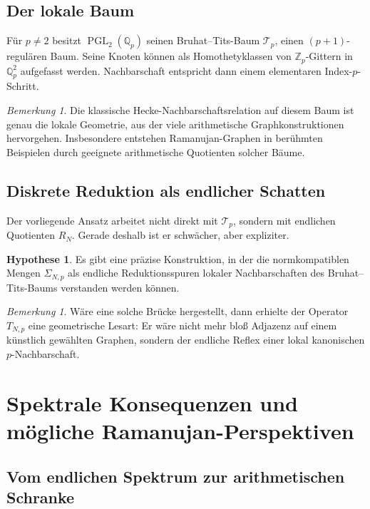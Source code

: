 \documentclass[12pt,a4paper]{article}
\newcommand{\PGL}{\operatorname{PGL}}
\theoremstyle{plain}
\theoremstyle{definition}
\newtheorem{hypothese}[satz]{Hypothese}
\theoremstyle{remark}
\newtheorem{bemerkung}[satz]{Bemerkung}
\newcommand{\Q}{\mathbb{Q}}
\newcommand{\Z}{\mathbb{Z}}
\begin{document}
	\subsection{Der lokale Baum}
	
	Für \(p\neq 2\) besitzt \(\PGL_2(\Q_p)\) seinen Bruhat--Tits-Baum \(\mathcal{T}_p\),
	einen \((p+1)\)-regulären Baum.
	Seine Knoten können als Homothetyklassen von \(\Z_p\)-Gittern in \(\Q_p^2\)
	aufgefasst werden.
	Nachbarschaft entspricht dann einem elementaren Index-\(p\)-Schritt.
	
	\begin{bemerkung}
		Die klassische Hecke-Nachbarschaftsrelation auf diesem Baum ist genau die
		lokale Geometrie, aus der viele arithmetische Graphkonstruktionen hervorgehen.
		Insbesondere entstehen Ramanujan-Graphen in berühmten Beispielen
		durch geeignete arithmetische Quotienten solcher Bäume.
	\end{bemerkung}
	
	\subsection{Diskrete Reduktion als endlicher Schatten}
	
	Der vorliegende Ansatz arbeitet nicht direkt mit \(\mathcal{T}_p\),
	sondern mit endlichen Quotienten \(R_N\).
	Gerade deshalb ist er schwächer, aber expliziter.
	
	\begin{hypothese}
		Es gibt eine präzise Konstruktion, in der die normkompatiblen Mengen
		\(\Sigma_{N,p}\) als endliche Reduktionsspuren lokaler Nachbarschaften
		des Bruhat--Tits-Baums verstanden werden können.
	\end{hypothese}
	
	\begin{bemerkung}
		Wäre eine solche Brücke hergestellt, dann erhielte der Operator \(T_{N,p}\)
		eine geometrische Lesart:
		Er wäre nicht mehr bloß Adjazenz auf einem künstlich gewählten Graphen,
		sondern der endliche Reflex einer lokal kanonischen \(p\)-Nachbarschaft.
	\end{bemerkung}
	
	\section{Spektrale Konsequenzen und mögliche Ramanujan-Perspektiven}
	
	\subsection{Vom endlichen Spektrum zur arithmetischen Schranke}
	
\end{document}
